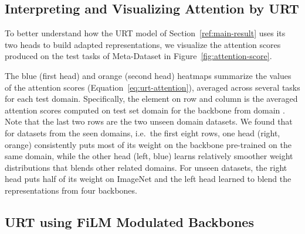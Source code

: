 \documentclass{article}
\begin{document}
\subsection{Interpreting and Visualizing Attention by URT}
To better understand how the URT model of Section~\ref{ref:main-result} uses its two heads to build adapted representations, we visualize the attention scores produced on the test tasks of Meta-Dataset in Figure~\ref{fig:attention-score}.



The blue (first head) and orange (second head) heatmaps summarize the values of the attention scores (Equation~\ref{eq:urt-attention}), averaged across several tasks for each test domain. Specifically, the element on row  and column  is the averaged attention scores  computed on test set domain  for the backbone from domain . Note that the last two rows are the two unseen domain datasets.
We found that for datasets from the seen domains, i.e.\ the first eight rows, one head (right, orange) consistently puts most of its weight on the backbone pre-trained on the same domain, while the other head (left, blue) learns relatively smoother weight distributions that blends other related domains. 
For unseen datasets, the right head puts half of its weight on ImageNet and the left head learned to blend the representations from four backbones.






\subsection{URT using FiLM Modulated Backbones}
\end{document}
